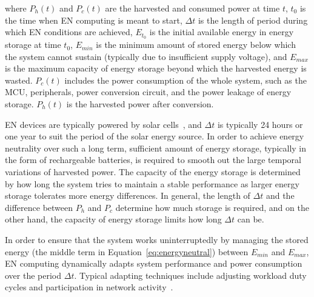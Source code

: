 where $P_h(t)$ and $P_c(t)$ are the harvested and consumed power at time $t$, $t_0$ is the time when EN computing is meant to start, $\Delta t$ is the length of period during which EN conditions are achieved, $E_{t_0}$ is the initial available energy in energy storage at time $t_0$, $E_{min}$ is the minimum amount of stored energy below which the system cannot sustain (typically due to insufficient supply voltage), and $E_{max}$ is the maximum capacity of energy storage beyond which the harvested energy is wasted. $P_c(t)$ includes the power consumption of the whole system, such as the MCU, peripherals, power conversion circuit, and the power leakage of energy storage. $P_h(t)$ is the harvested power after conversion. 

EN devices are typically powered by solar cells~\cite{escolar2014energy}, and $\Delta t$ is typically 24 hours or one year to suit the period of the solar energy source. In order to achieve energy neutrality over such a long term, sufficient amount of energy storage, typically in the form of rechargeable batteries, is required to smooth out the large temporal variations of harvested power. The capacity of the energy storage is determined by how long the system tries to maintain a stable performance as larger energy storage tolerates more energy differences. In general, the length of $\Delta t$ and the difference between $P_h$ and $P_c$ determine how much storage is required, and on the other hand, the capacity of energy storage limits how long $\Delta t$ can be.

In order to ensure that the system works uninterruptedly by managing the stored energy (the middle term in Equation~\ref{eq:energyneutral}) between $E_{min}$ and $E_{max}$, EN computing dynamically adapts system performance and power consumption over the period $\Delta t$. Typical adapting techniques include adjusting workload duty cycles and participation in network activity~\cite{merrett2017energy}.


